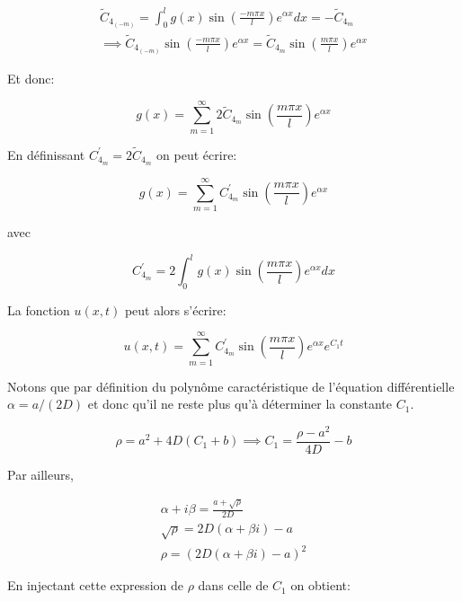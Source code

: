 \documentclass[a4paper, 12pt]{report}
\begin{document}
\begin{align}
  \tilde{C}_{4_{(-m)}} = \int_0^l g(x) \sin \left (\frac{-m \pi x}{l} \right ) e^{\alpha x} dx = -\tilde{C}_{4_m}\\
  \implies \tilde{C}_{4_{(-m)}} \sin \left (\frac{-m \pi x}{l} \right ) e^{\alpha x} = \tilde{C}_{4_m} \sin \left (\frac{m \pi x}{l} \right ) e^{\alpha x}
\end{align}

Et donc:

\begin{equation}
  g(x) = \sum_{m=1}^{\infty} 2 \tilde{C}_{4_m} \sin \left (\frac{m \pi x}{l} \right ) e^{\alpha x}
\end{equation}

En définissant $C^'_{4_m} = 2 \tilde{C}_{4_m}$ on peut écrire:

\begin{equation}
  g(x) = \sum_{m=1}^{\infty} C^'_{4_m} \sin \left (\frac{m \pi x}{l} \right ) e^{\alpha x}
\end{equation}

avec

\begin{equation}
  C^'_{4_m} =  2 \int_0^l g(x) \sin \left (\frac{m \pi x}{l} \right ) e^{\alpha x} dx
\end{equation}

La fonction $u(x,t)$ peut alors s'écrire:

\begin{equation}
u(x,t) = \sum_{m=1}^{\infty} C^'_{4_m} \sin \left (\frac{m \pi x}{l} \right ) e^{\alpha x} e^{C_1 t}
\end{equation}

Notons que par définition du polynôme caractéristique de l'équation différentielle
$\alpha = a/(2D)$ et donc qu'il ne reste plus qu'à déterminer la constante $C_1$.

\begin{equation}
  \rho = a^2 + 4D (C_1 +b) \implies \boxed{C_1 = \frac{\rho-a^2}{4D}-b}
\end{equation}

Par ailleurs,

\begin{align}
  \alpha + i \beta = \frac{a + \sqrt{\rho}}{2D}\\
  \sqrt{\rho} = 2D (\alpha + \beta i) - a\\
  \rho = \left ( 2D (\alpha + \beta i) - a \right )^2
\end{align}

En injectant cette expression de $\rho$ dans celle de $C_1$ on obtient:
\end{document}
